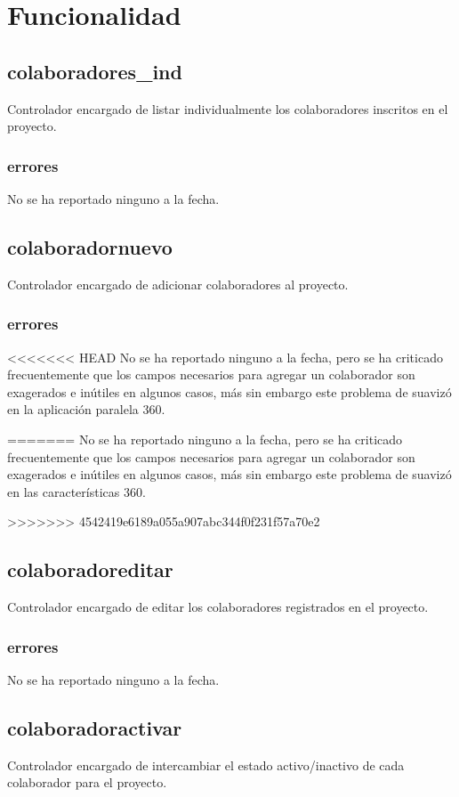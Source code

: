 \documentclass[10pt,a4paper]{book}
\begin{document}
	\section{Funcionalidad}

	\subsection{colaboradores\_ind}
	Controlador encargado de listar individualmente los colaboradores inscritos en el proyecto.
	\subsubsection{errores}
	No se ha reportado ninguno a la fecha.


	\subsection{colaboradornuevo}
	Controlador encargado de adicionar colaboradores al proyecto.
	\subsubsection{errores}
<<<<<<< HEAD
	No se ha reportado ninguno a la fecha, pero se ha criticado frecuentemente que los campos necesarios para agregar un colaborador son exagerados e inútiles en algunos casos, más sin embargo este problema de suavizó en la aplicación paralela 360.

=======
	No se ha reportado ninguno a la fecha, pero se ha criticado frecuentemente que los campos necesarios para agregar un colaborador son exagerados e inútiles en algunos casos, más sin embargo este problema de suavizó en las características 360.
	
>>>>>>> 4542419e6189a055a907abc344f0f231f57a70e2
	\subsection{colaboradoreditar}
	Controlador encargado de editar los colaboradores registrados en el proyecto.
	\subsubsection{errores}
	No se ha reportado ninguno a la fecha.

	\subsection{colaboradoractivar}
	Controlador encargado de intercambiar el estado activo/inactivo de cada colaborador para el proyecto.
\end{document}
